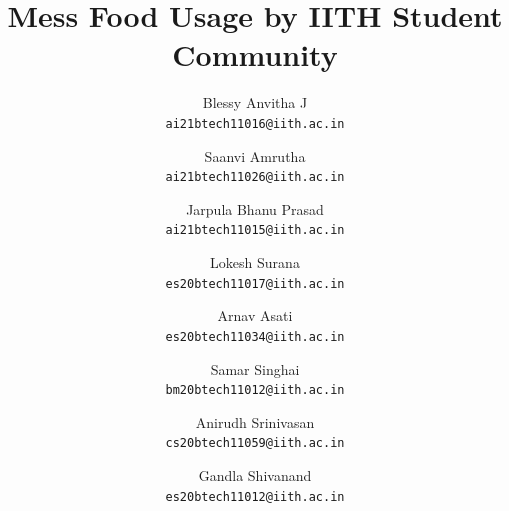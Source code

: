 \documentclass{article}
\begin{document}
\title{\textbf{Mess Food Usage by IITH Student Community}} 
\author{Blessy Anvitha J\\ \texttt{ai21btech11016@iith.ac.in} \and Saanvi Amrutha \\ \texttt{ai21btech11026@iith.ac.in} \and Jarpula Bhanu Prasad \\ \texttt{ai21btech11015@iith.ac.in} \and 	Lokesh Surana \\ \texttt{es20btech11017@iith.ac.in} \and Arnav Asati \\ \texttt{es20btech11034@iith.ac.in} \and Samar Singhai \\ \texttt{bm20btech11012@iith.ac.in} \and Anirudh Srinivasan \\ \texttt{cs20btech11059@iith.ac.in} \and Gandla Shivanand \\ \texttt{es20btech11012@iith.ac.in}} 
     
\maketitle
\bigskip
\end{document}
